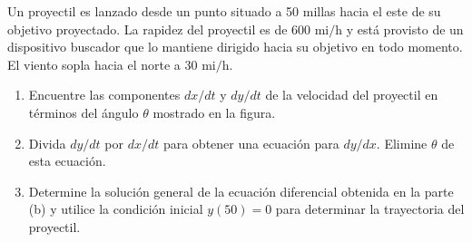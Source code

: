\item Un proyectil es lanzado desde un punto situado a 50 millas hacia el este de su objetivo proyectado. La rapidez del proyectil es de $600 \text{ mi/h}$ y está provisto de un dispositivo buscador que lo mantiene dirigido hacia su objetivo en todo momento. El viento sopla hacia el norte a $30 \text{ mi/h}$.
    \begin{enumerate}
        \item[(a)] Encuentre las componentes $dx/dt$ y $dy/dt$ de la velocidad del proyectil en términos del ángulo $\theta$ mostrado en la figura.
        \item[(b)] Divida $dy/dt$ por $dx/dt$ para obtener una ecuación para $dy/dx$. Elimine $\theta$ de esta ecuación.
        \item[(c)] Determine la solución general de la ecuación diferencial obtenida en la parte (b) y utilice la condición inicial $y(50) = 0$ para determinar la trayectoria del proyectil.
    \end{enumerate}
